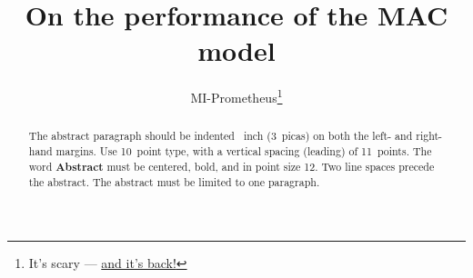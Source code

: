 \documentclass{article}
\title{On the performance of the MAC model}
\author{
  MI-Prometheus\thanks{%
  It's scary --- \href{https://www.imdb.com/title/tt1446714/}{and it's back!}} \\
}
\theoremstyle{remark}
\begin{document}

\maketitle

\begin{abstract}
  The abstract paragraph should be indented ~inch
  (3~picas) on both the left- and right-hand margins. Use 10~point
  type, with a vertical spacing (leading) of 11~points.  The word
  \textbf{Abstract} must be centered, bold, and in point size 12. Two
  line spaces precede the abstract. The abstract must be limited to
  one paragraph.
\end{abstract}








\end{document}
